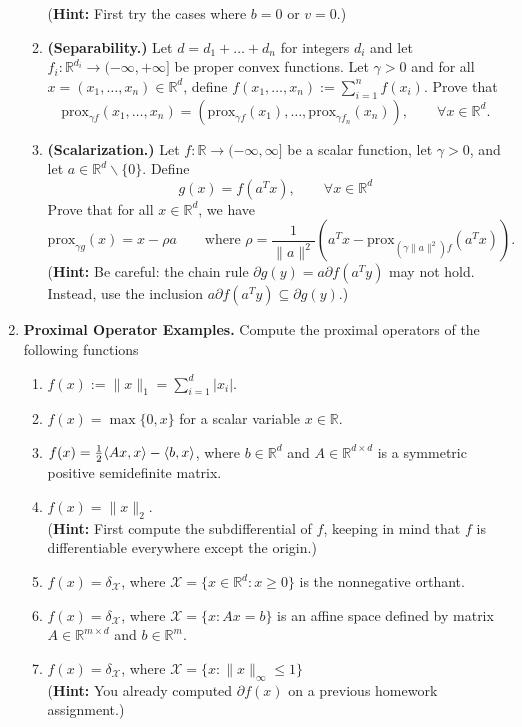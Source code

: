 \documentclass[12pt]{article}
\numberwithin{equation}{section}
\newcommand{\RR}{\mathbb{R}}
\newcommand{\cX}{\mathcal{X}}
\newcommand{\prox}{\mathrm{prox}}
\theoremstyle{remark}
\DeclarePairedDelimiter{\dotp}{\langle}{\rangle}
\begin{document}
\begin{enumerate}
\begin{enumerate}
$$$$
({\bf Hint:} First try the cases where $b = 0$ or $v = 0$.)
\item {\bf (Separability.)} Let $d = d_1 + \ldots + d_n$ for integers $d_i$ and let $f_i \colon \RR^{d_i} \rightarrow (-\infty, +\infty]$ be proper convex functions. Let $\gamma > 0$ and for all $x = (x_1, \ldots, x_n) \in \RR^d$, define $f(x_1, \ldots, x_n) := \sum_{i=1}^n f(x_i)$. Prove that 
$$
\prox_{\gamma f}(x_1, \ldots, x_n) = (\prox_{\gamma f}(x_1), \ldots, \prox_{\gamma f_n}(x_n)), \qquad \forall x \in \RR^d.
$$
\item {\bf (Scalarization.)} \Coffeecup Let $f \colon \RR \rightarrow (-\infty, \infty]$ be a scalar function, let $\gamma > 0$, and let $a \in \RR^d\backslash \{0\}$. Define
$$
g(x) = f(a^Tx), \qquad \forall x \in \RR^d
$$
Prove that for all $x \in \RR^d$, we have
$$
\prox_{\gamma g}(x) = x - \rho a \qquad \text{where } \rho = \frac{1}{\|a\|^2} (a^T x - \prox_{(\gamma\|a\|^2) f}(a^T x)).
$$
({\bf Hint:} Be careful: the chain rule $\partial g(y) = a \partial f(a^T y)$ may not hold. Instead, use the inclusion $a \partial f(a^T y) \subseteq \partial g(y)$.)
\end{enumerate}
\item {\bf Proximal Operator Examples.} Compute the proximal operators of the following functions
\begin{enumerate}
\item $f(x) := \|x\|_1 = \sum_{i=1}^d |x_i|.$
\item $f(x) = \max\{0, x\}$ for a scalar variable $x \in \RR$.
\item $f(x) = \frac{1}{2}\dotp{Ax, x} - \dotp{b, x}$, where $b \in \RR^d$ and $A \in \RR^{d\times d}$ is a symmetric positive semidefinite matrix. 
\item $f(x) = \|x\|_2$.\\
({\bf Hint:} First compute the subdifferential of $f$, keeping in mind that $f$ is differentiable everywhere except the origin.) 
\item $f(x) = \delta_{\cX}$, where $\cX = \{ x \in \RR^d \colon x \geq 0\}$ is the nonnegative orthant.
\item $f(x) = \delta_{\cX}$, where $\cX = \{x \colon Ax = b\}$ is an affine space defined by matrix $A \in \RR^{m \times d}$ and $b \in \RR^m$.
\item $f(x) = \delta_{\cX}$, where $\cX = \{ x \colon \|x\|_\infty \leq 1\}$ \\
({\bf Hint:} You already computed $\partial f(x)$ on a previous homework assignment.) 
\end{enumerate}

\end{enumerate}
\end{document}
